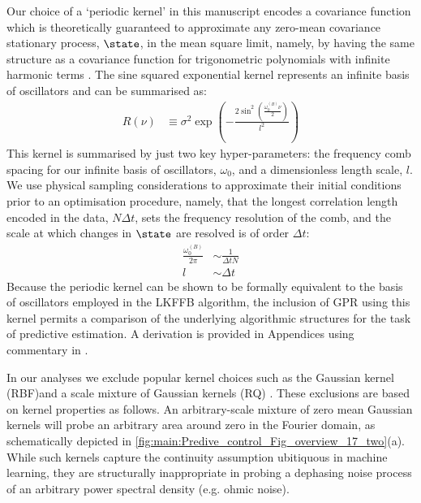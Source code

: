 Our choice of a `periodic kernel' in this manuscript encodes a covariance function which is theoretically guaranteed to approximate any zero-mean covariance stationary process, $\state$, in the mean square limit, namely, by having the same structure as a covariance function for trigonometric polynomials with infinite harmonic terms \cite{solin2014explicit, karlin2012first}. The sine squared exponential kernel represents an infinite basis of oscillators and can be summarised as:
\begin{align}
R(\nu) &\equiv \sigma^2 \exp (- \frac{2\sin^2(\frac{\omega_0^{(B)}\nu}{2})}{l^2}) 
\end{align} 
This kernel is summarised by just two key hyper-parameters: the frequency comb spacing for our infinite basis of oscillators, $\omega_0$, and a dimensionless length scale, $l$. We use physical sampling considerations to approximate their initial conditions prior to an optimisation procedure, namely, that the longest correlation length encoded in the data, $N \Delta t $, sets the frequency resolution of the comb, and the scale at which changes in $\state$ are resolved is of order $\Delta t$:
\begin{align}
\frac{\omega_0^{(B)}}{2\pi} & \sim  \frac{1}{\Delta t N} \\
l & \sim \Delta t
\end{align} 
Because the periodic kernel can be shown to be formally equivalent to the basis of oscillators employed in the LKFFB algorithm, the inclusion of GPR using this kernel permits a comparison of the underlying algorithmic structures for the task of predictive estimation.  A derivation is provided in Appendices using commentary in \cite{solin2014explicit}.

In our analyses we exclude popular kernel choices such as the Gaussian kernel (RBF)and  a scale mixture of Gaussian kernels (RQ) \cite{rasmussen2005gaussian, tobar2015learning}. These exclusions are based on kernel properties as follows. An arbitrary-scale mixture of zero mean Gaussian kernels will probe an arbitrary area around zero in the Fourier domain, as schematically depicted in \cref{fig:main:Predive_control_Fig_overview_17_two}(a). While such kernels capture the continuity assumption ubitiquous in machine learning, they are structurally inappropriate in probing a dephasing noise process of an arbitrary power spectral density (e.g. ohmic noise).  


